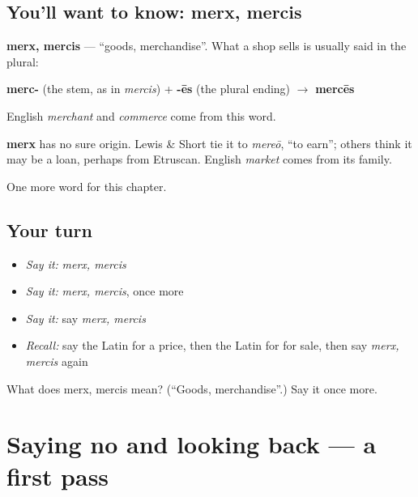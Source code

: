 \subsection*{You'll want to know: merx, mercis}
\textbf{merx, mercis} — \textquotedblleft{}goods, merchandise\textquotedblright{}. What a shop sells is usually said in the plural:

\textbf{merc-} (the stem, as in \emph{mercis}) + \textbf{-ēs} (the plural ending) $\to$ \textbf{mercēs}

English \emph{merchant} and \emph{commerce} come from this word.

\begin{cousinweb}
\textbf{merx} has no sure origin. Lewis \& Short tie it to \emph{mereō}, \textquotedblleft{}to earn\textquotedblright{}; others think it may be a loan, perhaps from Etruscan. English \emph{market} comes from its family.
\end{cousinweb}

\begin{grammarlens}[title={What you've built}]
One more word for this chapter.
\end{grammarlens}

\subsection*{Your turn}
\begin{itemize}
\raggedright
  \item \emph{Say it:} \emph{merx, mercis}
  \item \emph{Say it:} \emph{merx, mercis}, once more
  \item \emph{Say it:} say \emph{merx, mercis}
  \item \emph{Recall:} say the Latin for a price, then the Latin for for sale, then say \emph{merx, mercis} again
\end{itemize}

\begin{tcolorbox}[breakable,colback=teal!4,colframe=teal!35!black,title={Before you move on}]
What does merx, mercis mean? (\textquotedblleft{}Goods, merchandise\textquotedblright{}.) Say it once more.
\end{tcolorbox}
\section[(dialogue)]{Saying no and looking back — a first pass}

\label{lesson:LA-R164-first-pass-saying-no-and-looking-back}



